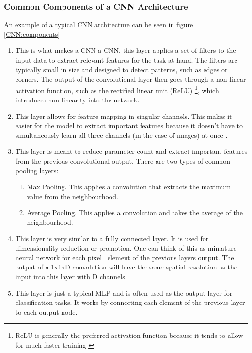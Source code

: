 \subsubsection*{Common Components of a CNN Architecture} \label{CNN:components}
An example of a typical CNN architecture can be seen in figure \ref{CNN:components}
\begin{enumerate}[align=left]
	\item[Convolutional Layer:] This is what makes a CNN a CNN, this layer applies a set of filters to the input data to extract relevant features for the task at hand. The filters are typically small in size and designed to detect patterns, such as edges or corners. The output of the convolutional layer then goes through a non-linear activation function, such as the rectified linear unit (ReLU) \footnote{ReLU is generally the preferred activation function because it tends to allow for much faster training \cite{krizhevsky2017imagenet}}, which introduces non-linearity into the network.
	\item[Deepthwise Convolutional Layer:] This layer allows for feature mapping in singular channels. This makes it easier for the model to extract important features because it doesn't have to simultaneously learn all three channels (in the case of images) at once \cite{chollet2017xception}.
	\item[Pooling Layer:] This layer is meant to reduce parameter count and extract important features from the previous convolutional output. There are two types of common pooling layers: \begin{enumerate}
		\item[1:] Max Pooling. This applies a convolution that extracts the maximum value from the neighbourhood.
		\item[2:] Average Pooling. This applies a convolution and takes the average of the neighbourhood.
	\end{enumerate}
	\item[1x1 Convolutional layer:] This layer is very similar to a fully connected layer. It is used for dimensionality reduction or promotion. One can think of this as miniature neural network for each pixel \ element of the previous layers output. The output of a 1x1xD convolution will have the same spatial resolution as the input into this layer with D channels.
	\item[Fully Connected Layer:] This layer is just a typical MLP and is often used as the output layer for classification tasks. It works by connecting each element of the previous layer to each output node.
\end{enumerate}

